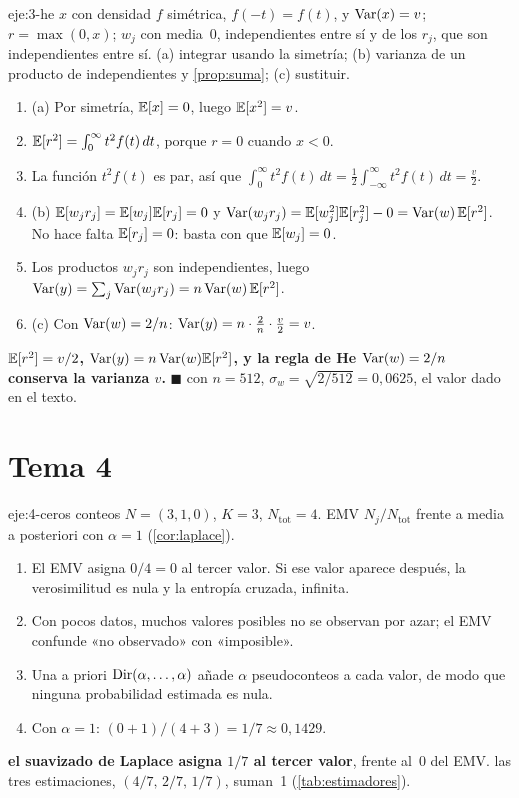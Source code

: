 \begin{solucion}{eje:3-he}
\datos $x$ con densidad $f$ simétrica, $f(-t)=f(t)$, y $\operatorname{Var}(x)=v$; $r=\max(0,x)$; $w_j$ con media~0, independientes entre sí y de los $r_j$, que son independientes entre sí.
\planteamiento (a) integrar usando la simetría; (b) varianza de un producto de independientes y \cref{prop:suma}; (c) sustituir.
\pasos
\begin{enumerate}[label=\arabic*.]
  \item (a) Por simetría, $\mathbb{E}[x]=0$, luego $\mathbb{E}[x^{2}]=v$.
  \item $\mathbb{E}[r^{2}]=\int_0^{\infty}t^{2}f(t)\,dt$, porque $r=0$ cuando $x<0$.
  \item La función $t^{2}f(t)$ es par, así que $\int_0^{\infty}t^{2}f(t)\,dt=\frac12\int_{-\infty}^{\infty}t^{2}f(t)\,dt=\frac v2$.
  \item (b) $\mathbb{E}[w_jr_j]=\mathbb{E}[w_j]\mathbb{E}[r_j]=0$ y $\operatorname{Var}(w_jr_j)=\mathbb{E}[w_j^{2}]\mathbb{E}[r_j^{2}]-0=\operatorname{Var}(w)\,\mathbb{E}[r^{2}]$. No hace falta $\mathbb{E}[r_j]=0$: basta con que $\mathbb{E}[w_j]=0$.
  \item Los productos $w_jr_j$ son independientes, luego $\operatorname{Var}(y)=\sum_j\operatorname{Var}(w_jr_j)=n\operatorname{Var}(w)\,\mathbb{E}[r^{2}]$.
  \item (c) Con $\operatorname{Var}(w)=2/n$: $\operatorname{Var}(y)=n\cdot\frac2n\cdot\frac v2=v$.
\end{enumerate}
\resultado \textbf{$\mathbb{E}[r^{2}]=v/2$, $\operatorname{Var}(y)=n\operatorname{Var}(w)\mathbb{E}[r^{2}]$, y la regla de He $\operatorname{Var}(w)=2/n$ conserva la varianza $v$.} $\blacksquare$
\comprobacion con $n=512$, $\sigma_w=\sqrt{2/512}=0{,}0625$, el valor dado en el texto.
\end{solucion}

\section{Tema 4}

\begin{solucion}{eje:4-ceros}
\datos conteos $N=(3,1,0)$, $K=3$, $N_{\mathrm{tot}}=4$.
\planteamiento EMV $N_j/N_{\mathrm{tot}}$ frente a media a posteriori con $\alpha=1$ (\cref{cor:laplace}).
\pasos
\begin{enumerate}[label=\arabic*.]
  \item El EMV asigna $0/4=0$ al tercer valor. Si ese valor aparece después, la verosimilitud es nula y la entropía cruzada, infinita.
  \item Con pocos datos, muchos valores posibles no se observan por azar; el EMV confunde «no observado» con «imposible».
  \item Una a priori $\operatorname{Dir}(\alpha,\dots,\alpha)$ añade $\alpha$ pseudoconteos a cada valor, de modo que ninguna probabilidad estimada es nula.
  \item Con $\alpha=1$: $(0+1)/(4+3)=1/7\approx 0{,}1429$.
\end{enumerate}
\resultado \textbf{el suavizado de Laplace asigna $1/7$ al tercer valor}, frente al~$0$ del EMV.
\comprobacion las tres estimaciones, $(4/7,\,2/7,\,1/7)$, suman~1 (\cref{tab:estimadores}).
\end{solucion}

